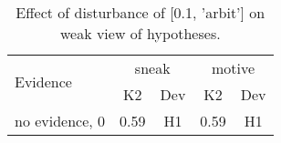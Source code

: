 \begin{table}\begin{tabular}{l|cc|cc}\toprule\multirow{2}{*}{Evidence} & \multicolumn{2}{c}{sneak}& \multicolumn{2}{c}{motive}\\& {K2} & {Dev}& {K2} & {Dev}\\\midrule
no evidence, 0 & \cellcolor{Bittersweet}0.59&\cellcolor{Bittersweet}H1&\cellcolor{Bittersweet}0.59&\cellcolor{Bittersweet}H1\\\bottomrule\end{tabular}\caption{Effect of disturbance of [0.1, 'arbit'] on weak view of hypotheses.}\end{table}